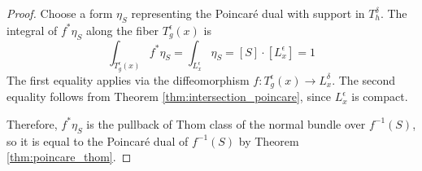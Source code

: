 \begin{proof}

	Choose a form $\eta_S$ representing the Poincar\'e dual with support in
	$T^\delta_h$. The integral of $f^*\eta_S$ along the fiber  $T^\epsilon_g(x)$
	is 
	 \[
	\int_{T^\epsilon_g(x)} f^*\eta_S 
	= \int_{L_x^\epsilon} \eta_S = [S] \cdot [L_x^\epsilon] = 1
	\] 
	The first equality applies via the diffeomorphism
	$f:T^\epsilon_g(x) \to L_x^\delta$. 
	The second equality follows from Theorem \ref{thm:intersection_poincare},
	since $L_x^\epsilon$ is compact.
	
	Therefore, $f^*\eta_S$ is the pullback of Thom class of the normal bundle over
	$f^{-1}(S)$, so it is equal to the Poincar\'e dual of $f^{-1}(S)$ by Theorem 
	\ref{thm:poincare_thom}.
\end{proof}
